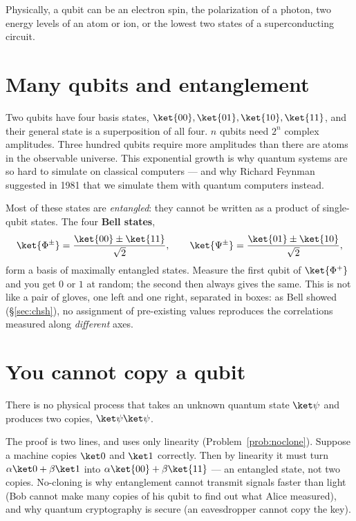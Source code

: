 Physically, a qubit can be an electron spin, the polarization of a photon, two energy levels of an atom or ion, or the lowest two states of a superconducting circuit.

\section{Many qubits and entanglement}

Two qubits have four basis states, $\ket{00},\ket{01},\ket{10},\ket{11}$, and their general state is a superposition of all four. $n$ qubits need $2^n$ complex amplitudes. Three hundred qubits require more amplitudes than there are atoms in the observable universe. This exponential growth is why quantum systems are so hard to simulate on classical computers --- and why Richard Feynman suggested in 1981 that we simulate them with quantum computers instead.

Most of these states are \emph{entangled}: they cannot be written as a product of single-qubit states. The four \textbf{Bell states},
\[
  \ket{\Phi^\pm} = \frac{\ket{00}\pm\ket{11}}{\sqrt2},\qquad \ket{\Psi^\pm} = \frac{\ket{01}\pm\ket{10}}{\sqrt2},
\]
form a basis of maximally entangled states. Measure the first qubit of $\ket{\Phi^+}$ and you get $0$ or $1$ at random; the second then always gives the same. This is not like a pair of gloves, one left and one right, separated in boxes: as Bell showed (\S\ref{sec:chsh}), no assignment of pre-existing values reproduces the correlations measured along \emph{different} axes.

\section{You cannot copy a qubit}

\begin{theorem}[No-cloning]
There is no physical process that takes an unknown quantum state $\ket\psi$ and produces two copies, $\ket\psi\ket\psi$.
\end{theorem}
The proof is two lines, and uses only linearity (Problem~\ref{prob:noclone}). Suppose a machine copies $\ket0$ and $\ket1$ correctly. Then by linearity it must turn $\alpha\ket0+\beta\ket1$ into $\alpha\ket{00}+\beta\ket{11}$ --- an entangled state, not two copies. No-cloning is why entanglement cannot transmit signals faster than light (Bob cannot make many copies of his qubit to find out what Alice measured), and why quantum cryptography is secure (an eavesdropper cannot copy the key).


